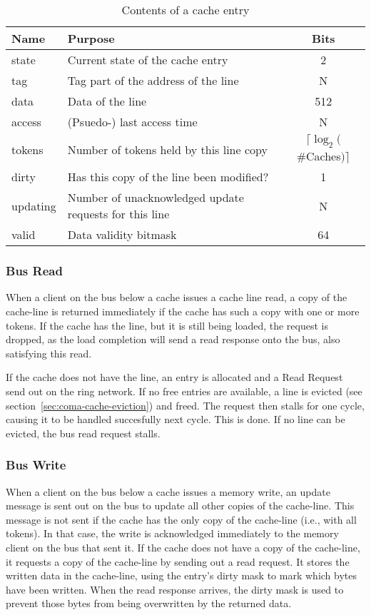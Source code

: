 \begin{table}
\begin{center}
\begin{tabularx}{\textwidth}{|l|X|c|}
\hline
Name & Purpose & Bits\\
\hline
\hline
state & Current state of the cache entry & 2 \\
tag & Tag part of the address of the line & N \\
data & Data of the line & 512 \\
access & (Psuedo-) last access time & N \\
tokens & Number of tokens held by this line copy & $\lceil \log_2($\#Caches$)\rceil$ \\
dirty & Has this copy of the line been modified? & 1 \\
updating & Number of unacknowledged update requests for this line & N \\
valid & Data validity bitmask & 64 \\
\hline
\end{tabularx}
\caption{Contents of a cache entry}
\label{table:cache_contents}
\end{center}
\end{table}

\subsubsection{Bus Read}
When a client on the bus below a cache issues a cache line read, a copy of the cache-line is returned immediately if the cache has such a copy with one or more tokens. If the cache has the line, but it is still being loaded, the request is dropped, as the load completion will send a read response onto the bus, also satisfying this read.

If the cache does not have the line, an entry is allocated and a Read Request send out on the ring network. If no free entries are available, a line is evicted (see section~\ref{sec:coma-cache-eviction}) and freed. The request then stalls for one cycle, causing it to be handled succesfully next cycle. This is done. If no line can be evicted, the bus read request stalls.

\subsubsection{Bus Write}
When a client on the bus below a cache issues a memory write, an update message is sent out on the bus to update all other copies of the cache-line. This message is not sent if the cache has the only copy of the cache-line (i.e., with all tokens). In that case, the write is acknowledged immediately to the memory client on the bus that sent it. If the cache does not have a copy of the cache-line, it requests a copy of the cache-line by sending out a read request. It stores the written data in the cache-line, using the entry's dirty mask to mark which bytes have been written. When the read response arrives, the dirty mask is used to prevent those bytes from being overwritten by the returned data.

